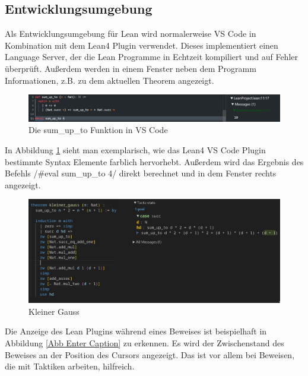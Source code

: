 \documentclass[10pt]{article}
\begin{document}
\subsection{Entwicklungsumgebung}
Als Entwicklungsumgebung für Lean wird normalerweise VS Code in Kombination mit dem Lean4 Plugin \cite{Q3} verwendet. Dieses implementiert einen Language Server, der die Lean Programme in Echtzeit kompiliert und auf Fehler überprüft. Außerdem werden in einem Fenster neben dem Programm Informationen, z.B. zu dem aktuellen Theorem angezeigt.
\begin{figure}[H]
    \centering
    \includegraphics[width=0.95\linewidth]{Abbildung sum_up_to.png}
    \caption{Die sum\_up\_to Funktion in VS Code}
    \label{Abb sum_up_to}
\end{figure}
\vspace{-0.2cm}
\noindent In Abbildung \ref{Abb sum_up_to} sieht man exemplarisch, wie das Lean4 VS Code Plugin bestimmte Syntax Elemente farblich hervorhebt. Außerdem wird das Ergebnis des Befehls \lean/#eval sum_up_to 4/ direkt berechnet und in dem Fenster rechts angezeigt.
\vspace{-0.2cm}
\hspace{-0.4cm}
\begin{figure}[H]
    \centering
    \includegraphics[width=0.65\linewidth]{kleiner_gauss.png}
    \caption{Kleiner Gauss}
    \label{kleiner gauss}
\end{figure}
\noindent Die Anzeige des Lean Plugins während eines Beweises ist beispielhaft in Abbildung \ref{Abb Enter Caption} zu erkennen. Es wird der Zwischenstand des Beweises an der Position des Cursors angezeigt. Das ist vor allem bei Beweisen, die mit Taktiken arbeiten, hilfreich.
\end{document}
